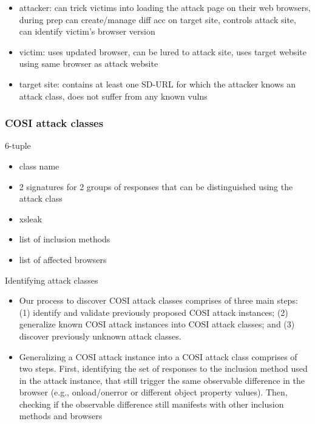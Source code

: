 \begin{enumerate}
    \begin{itemize}
        \item attacker: can trick victims into loading the attack page on their web browsers, during prep can create/manage diff acc on target site, controls attack site, can identify victim's browser version
        \item victim: uses updated browser, can be lured to attack site, uses target website using same browser as attack website
        \item target site: contains at least one SD-URL for which the attacker knows an attack class, does not suffer from any known vulns
    \end{itemize}
\end{enumerate}

\subsubsection{COSI attack classes}

6-tuple

\begin{itemize}
    \item class name
    \item 2 signatures for 2 groups of responses that can be distinguished using the attack class
    \item xsleak
    \item list of inclusion methods
    \item list of affected browsers
\end{itemize}

Identifying attack classes

\begin{itemize}
    \item Our process to discover COSI attack classes comprises of three main steps: (1) identify and validate previously proposed COSI attack instances; (2) generalize known COSI attack instances into COSI attack classes; and (3) discover previously unknown attack classes.
    \item Generalizing a COSI attack instance into a COSI attack class comprises of two steps. First, identifying the set of responses to the inclusion method used in the attack instance, that still trigger the same observable difference in the browser (e.g., onload/onerror or different object property values). Then, checking if the observable difference still manifests with other inclusion methods and browsers
\end{itemize}